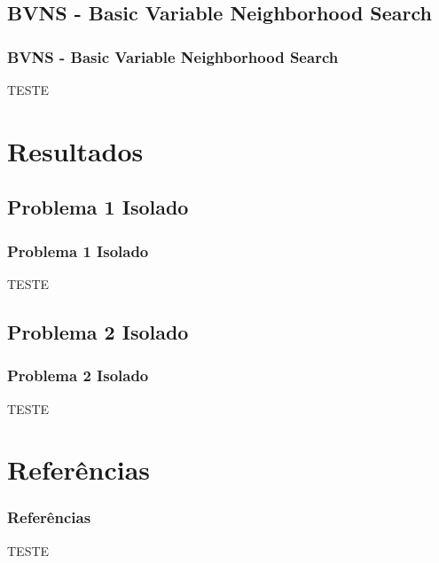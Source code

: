 \documentclass{beamer}
\begin{document}
\subsection{BVNS - Basic Variable Neighborhood Search}
    \begin{frame}
        \frametitle{BVNS - Basic Variable Neighborhood Search}

        \begin{center}
            TESTE
        \end{center}
    \end{frame}

\section{Resultados}

\subsection{Problema 1 Isolado}
    \begin{frame}
        \frametitle{Problema 1 Isolado}

        \begin{center}
            TESTE
        \end{center}
    \end{frame}

    \subsection{Problema 2 Isolado}
    \begin{frame}
        \frametitle{Problema 2 Isolado}

        \begin{center}
            TESTE
        \end{center}
    \end{frame}


\section{Referências}

    \begin{frame}
        \frametitle{Referências}

        \begin{center}
            TESTE
        \end{center}
    \end{frame}
\end{document}
